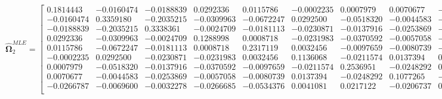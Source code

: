 \documentclass{article}\usepackage[]{graphicx}\usepackage[]{xcolor}
\def\bs{\boldsymbol}
\begin{document}
 
 \[
 \widehat{\bs{\Omega}}_{2}^{MLE} = 
 
  \begin{bmatrix}
 
 
 
 0.1814443 & -0.0160474 & -0.0188839 & 0.0292336 & 0.0115786 & -0.0002235 & 0.0007979 & 0.0070677 & -0.0266787\\
 
 -0.0160474 & 0.3359180 & -0.2035215 & -0.0309963 & -0.0672247 & 0.0292500 & -0.0518320 & -0.0044583 & -0.0069600\\
 
 -0.0188839 & -0.2035215 & 0.3338361 & -0.0024709 & -0.0181113 & -0.0230871 & -0.0137916 & -0.0253869 & -0.0032278\\
 
 0.0292336 & -0.0309963 & -0.0024709 & 0.1288998 & 0.0008718 & -0.0231983 & -0.0370592 & -0.0057058 & -0.0266685\\
 
 0.0115786 & -0.0672247 & -0.0181113 & 0.0008718 & 0.2317119 & 0.0032456 & -0.0097659 & -0.0080739 & -0.0534376\\
 
 -0.0002235 & 0.0292500 & -0.0230871 & -0.0231983 & 0.0032456 & 0.1136068 & -0.0211574 & 0.0137394 & 0.0041081\\
 
 0.0007979 & -0.0518320 & -0.0137916 & -0.0370592 & -0.0097659 & -0.0211574 & 0.2536951 & -0.0248292 & 0.0217122\\
 
 0.0070677 & -0.0044583 & -0.0253869 & -0.0057058 & -0.0080739 & 0.0137394 & -0.0248292 & 0.1077265 & -0.0206737\\
 
 -0.0266787 & -0.0069600 & -0.0032278 & -0.0266685 & -0.0534376 & 0.0041081 & 0.0217122 & -0.0206737 & 0.2105761\\
 \end{bmatrix}
 \]
 
\end{document}
